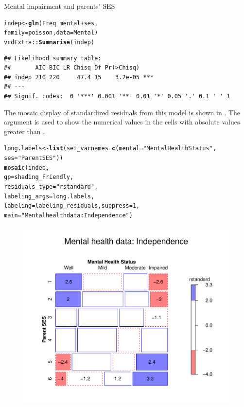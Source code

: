 \documentclass[11pt]{book}\usepackage[]{graphicx}\usepackage[]{color}
\makeatletter
\newcommand{\hlnum}[1]{\textcolor[rgb]{0.686,0.059,0.569}{#1}}%
\newcommand{\hlstr}[1]{\textcolor[rgb]{0.192,0.494,0.8}{#1}}%
\newcommand{\hlopt}[1]{\textcolor[rgb]{0,0,0}{#1}}%
\newcommand{\hlstd}[1]{\textcolor[rgb]{0.345,0.345,0.345}{#1}}%
\newcommand{\hlkwb}[1]{\textcolor[rgb]{0.69,0.353,0.396}{#1}}%
\newcommand{\hlkwc}[1]{\textcolor[rgb]{0.333,0.667,0.333}{#1}}%
\newcommand{\hlkwd}[1]{\textcolor[rgb]{0.737,0.353,0.396}{\textbf{#1}}}%
\newenvironment{kframe}{%
 \def\at@end@of@kframe{}%
 \ifinner\ifhmode%
  \def\at@end@of@kframe{\end{minipage}}%
  \begin{minipage}{\columnwidth}%
 \fi\fi%
 \def\FrameCommand##1{\hskip\@totalleftmargin \hskip-\fboxsep
 \colorbox{shadecolor}{##1}\hskip-\fboxsep
     \hskip-\linewidth \hskip-\@totalleftmargin \hskip\columnwidth}%
 \MakeFramed {\advance\hsize-\width
   \@totalleftmargin\z@ \linewidth\hsize
   \@setminipage}}%
 {\par\unskip\endMakeFramed%
 \at@end@of@kframe}
\newenvironment{knitrout}{}{} %
\renewenvironment{knitrout}{\small\renewcommand{\baselinestretch}{.85}}{} %
\makeatother
\begin{document}
\begin{Example}[mental4]{Mental impairment and parents' SES}
\begin{knitrout}
\color{fgcolor}\begin{kframe}
\begin{alltt}
\hlstd{indep} \hlkwb{<-} \hlkwd{glm}\hlstd{(Freq} \hlopt{~} \hlstd{mental} \hlopt{+} \hlstd{ses,}
                \hlkwc{family} \hlstd{= poisson,} \hlkwc{data} \hlstd{= Mental)}
\hlstd{vcdExtra::}\hlkwd{Summarise}\hlstd{(indep)}
\end{alltt}
\begin{verbatim}
## Likelihood summary table:
##       AIC BIC LR Chisq Df Pr(>Chisq)    
## indep 210 220     47.4 15    3.2e-05 ***
## ---
## Signif. codes:  0 '***' 0.001 '**' 0.01 '*' 0.05 '.' 0.1 ' ' 1
\end{verbatim}
\end{kframe}
\end{knitrout}
The mosaic display of standardized residuals from this model is shown
in .  The argument 
is used to show the numerical values in the cells with absolute values greater
than .
\begin{knitrout}
\color{fgcolor}\begin{kframe}
\begin{alltt}
\hlstd{long.labels} \hlkwb{<-} \hlkwd{list}\hlstd{(}\hlkwc{set_varnames} \hlstd{=} \hlkwd{c}\hlstd{(}\hlkwc{mental}\hlstd{=}\hlstr{"Mental Health Status"}\hlstd{,}
                                     \hlkwc{ses}\hlstd{=}\hlstr{"Parent SES"}\hlstd{))}
\hlkwd{mosaic}\hlstd{(indep,}
       \hlkwc{gp}\hlstd{=shading_Friendly,}
       \hlkwc{residuals_type}\hlstd{=}\hlstr{"rstandard"}\hlstd{,}
       \hlkwc{labeling_args} \hlstd{= long.labels,}
       \hlkwc{labeling}\hlstd{=labeling_residuals,} \hlkwc{suppress}\hlstd{=}\hlnum{1}\hlstd{,}
       \hlkwc{main}\hlstd{=}\hlstr{"Mental health data: Independence"}\hlstd{)}
\end{alltt}
\end{kframe}\begin{figure}[!htbp]


\centerline{\includegraphics[width=.7\textwidth]{ch08/fig/mental-indep-1} }


\end{figure}
\end{knitrout}
\end{Example}
\end{document}
